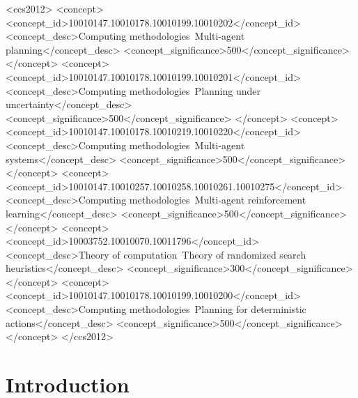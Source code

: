 \documentclass[sigconf]{acmart}
\begin{document}
\begin{CCSXML}
<ccs2012>
   <concept>
       <concept_id>10010147.10010178.10010199.10010202</concept_id>
       <concept_desc>Computing methodologies~Multi-agent planning</concept_desc>
       <concept_significance>500</concept_significance>
       </concept>
   <concept>
       <concept_id>10010147.10010178.10010199.10010201</concept_id>
       <concept_desc>Computing methodologies~Planning under uncertainty</concept_desc>
       <concept_significance>500</concept_significance>
       </concept>
   <concept>
       <concept_id>10010147.10010178.10010219.10010220</concept_id>
       <concept_desc>Computing methodologies~Multi-agent systems</concept_desc>
       <concept_significance>500</concept_significance>
       </concept>
   <concept>
       <concept_id>10010147.10010257.10010258.10010261.10010275</concept_id>
       <concept_desc>Computing methodologies~Multi-agent reinforcement learning</concept_desc>
       <concept_significance>500</concept_significance>
       </concept>
   <concept>
       <concept_id>10003752.10010070.10011796</concept_id>
       <concept_desc>Theory of computation~Theory of randomized search heuristics</concept_desc>
       <concept_significance>300</concept_significance>
       </concept>
   <concept>
       <concept_id>10010147.10010178.10010199.10010200</concept_id>
       <concept_desc>Computing methodologies~Planning for deterministic actions</concept_desc>
       <concept_significance>500</concept_significance>
       </concept>
 </ccs2012>
\end{CCSXML}



\maketitle

\section{Introduction}
\label{sec:introduction}
\end{document}

